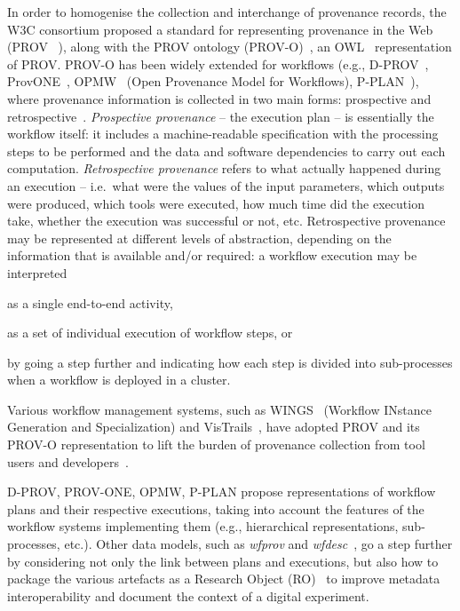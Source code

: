 In order to homogenise the collection and interchange of provenance records, the W3C consortium proposed a standard for representing provenance in the Web (PROV ~\cite{Moreau 2013}), along with the PROV ontology (PROV-O)~\cite{Lebo 2013}, an OWL~\cite{W3C OWL Working Group 2012} representation of PROV. %
PROV-O has been widely extended for workflows (e.g., D-PROV~\cite{Missier 2013}, ProvONE~\cite{Cuevas-Vicenttin 2016}, OPMW~\cite{Garijo 2011} (Open Provenance Model for Workflows), P-PLAN~\cite{Garijo 2012}), where provenance information is collected in two main forms: prospective and retrospective~\cite{Freire 2008}. \emph{Prospective provenance} -- the execution plan -- is essentially the workflow itself: it includes a machine-readable specification with the processing steps to be performed and the data and software dependencies to carry out each computation.
\emph{Retrospective provenance} refers to what actually happened during an execution -- i.e.~what were the values of the input parameters, which outputs were produced, which tools were executed, how much time did the execution take, whether the execution was successful or not, etc.
Retrospective provenance may be represented at different levels of abstraction, depending on the information that is available and/or required: a workflow execution may be interpreted
\begin{inlineenum}
\item as a single end-to-end activity,
\item as a set of individual execution of workflow steps, or
\item by going a step further and indicating how each step is divided into sub-processes when a workflow is deployed in a cluster.
\end{inlineenum}
Various workflow management systems, such as WINGS~\cite{Gil 2011} (Workflow INstance Generation and Specialization) and VisTrails~\cite{Scheidegger 2008,Costa 2013}, have adopted PROV and its PROV-O representation  to lift the burden of provenance collection from tool users and developers~\cite{Atkinson 2017,Perez 2018}.

D-PROV, PROV-ONE, OPMW, P-PLAN propose representations of workflow plans and their respective executions, taking into account the features of the workflow systems implementing them (e.g., hierarchical representations, sub-processes, etc.).
Other data models, such as \emph{wfprov} and \emph{wfdesc}~\cite{Belhajjame 2015}, go a step further by considering not only the link between plans and executions, but also how to package the various artefacts as a Research Object (RO)~\cite{Bechhofer 2013} to improve metadata interoperability and document the context of a digital experiment.

